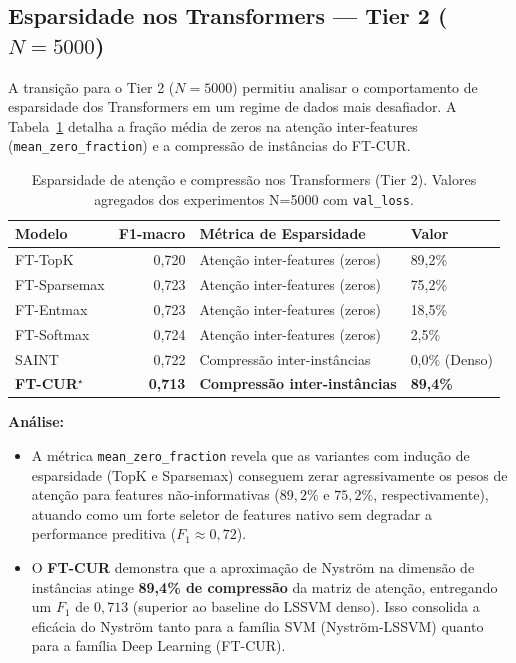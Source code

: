 \documentclass[12pt,a4paper]{article}
\begin{document}
\subsection{Esparsidade nos Transformers --- Tier 2 ($N=5000$)}

A transição para o Tier 2 ($N=5000$) permitiu analisar o comportamento de esparsidade dos Transformers em um regime de dados mais desafiador. A Tabela~\ref{tab:sparsity_ft_tier2} detalha a fração média de zeros na atenção inter-features (\texttt{mean\_zero\_fraction}) e a compressão de instâncias do FT-CUR.

\begin{table}[H]
\centering
\caption{Esparsidade de atenção e compressão nos Transformers (Tier 2). Valores agregados dos experimentos N=5000 com \texttt{val\_loss}.}
\label{tab:sparsity_ft_tier2}
\begin{tabular}{lrll}
\toprule
\textbf{Modelo} & \textbf{F1-macro} & \textbf{Métrica de Esparsidade} & \textbf{Valor} \\
\midrule
FT-TopK & 0,720 & Atenção inter-features (zeros) & 89,2\% \\
FT-Sparsemax & 0,723 & Atenção inter-features (zeros) & 75,2\% \\
FT-Entmax & 0,723 & Atenção inter-features (zeros) & 18,5\% \\
FT-Softmax & 0,724 & Atenção inter-features (zeros) & 2,5\% \\
\midrule
SAINT & 0,722 & Compressão inter-instâncias & 0,0\% (Denso) \\
\textbf{FT-CUR$^\star$} & \textbf{0,713} & \textbf{Compressão inter-instâncias} & \textbf{89,4\%} \\
\bottomrule
\end{tabular}
\end{table}

\textbf{Análise:}
\begin{itemize}
  \item A métrica \texttt{mean\_zero\_fraction} revela que as variantes com indução de esparsidade (TopK e Sparsemax) conseguem zerar agressivamente os pesos de atenção para features não-informativas ($89{,}2\%$ e $75{,}2\%$, respectivamente), atuando como um forte seletor de features nativo sem degradar a performance preditiva ($F_1 \approx 0{,}72$).
  \item O \textbf{FT-CUR} demonstra que a aproximação de Nyström na dimensão de instâncias atinge \textbf{89,4\% de compressão} da matriz de atenção, entregando um $F_1$ de $0{,}713$ (superior ao baseline do LSSVM denso). Isso consolida a eficácia do Nyström tanto para a família SVM (Nyström-LSSVM) quanto para a família Deep Learning (FT-CUR).
\end{itemize}
\end{document}
